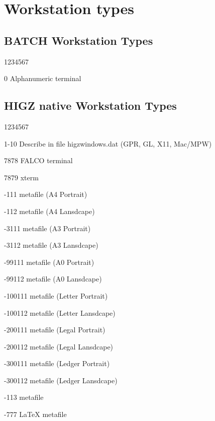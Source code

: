 \section{Workstation types}

\subsection{BATCH Workstation Types}
\begin{DLtt}{1234567}
\item[0]  Alphanumeric terminal
\end{DLtt}

\subsection{HIGZ native Workstation Types}
\begin{DLtt}{1234567}
\item[1-10]  Describe in file higzwindows.dat (GPR, GL, X11, Mac/MPW)
\item[7878]  FALCO terminal
\item[7879]  xterm
\item[-111] \PS{} metafile (A4 Portrait)
\item[-112] \PS{} metafile (A4 Lansdcape)
\item[-3111]  \PS{} metafile (A3 Portrait)
\item[-3112]  \PS{} metafile (A3 Lansdcape)
\item[-99111]  \PS{} metafile (A0 Portrait)
\item[-99112]  \PS{} metafile (A0 Lansdcape)
\item[-100111]  \PS{} metafile (Letter Portrait)
\item[-100112]  \PS{} metafile (Letter Lansdcape)
\item[-200111]  \PS{} metafile (Legal Portrait)
\item[-200112]  \PS{} metafile (Legal Lansdcape)
\item[-300111]  \PS{} metafile (Ledger Portrait)
\item[-300112]  \PS{} metafile (Ledger Lansdcape)
\item[-113]  \EPS{} metafile
\item[-777]  \LaTeX{} metafile
\end{DLtt}

